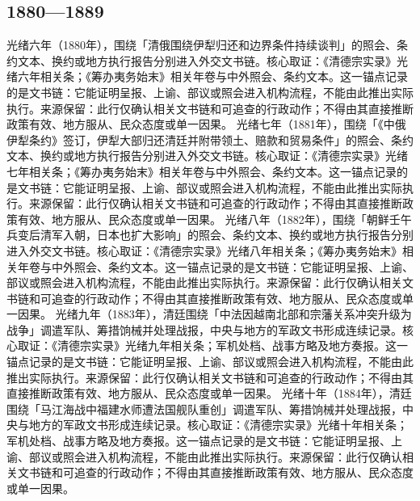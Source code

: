 \subsection{1880—1889}
光绪六年（1880年），围绕「清俄围绕伊犁归还和边界条件持续谈判」的照会、条约文本、换约或地方执行报告分别进入外交文书链。核心取证：《清德宗实录》光绪六年相关条；《筹办夷务始末》相关年卷与中外照会、条约文本。这一锚点记录的是文书链：它能证明呈报、上谕、部议或照会进入机构流程，不能由此推出实际执行。来源保留：此行仅确认相关文书链和可追查的行政动作；不得由其直接推断政策有效、地方服从、民众态度或单一因果。
光绪七年（1881年），围绕「《中俄伊犁条约》签订，伊犁大部归还清廷并附带领土、赔款和贸易条件」的照会、条约文本、换约或地方执行报告分别进入外交文书链。核心取证：《清德宗实录》光绪七年相关条；《筹办夷务始末》相关年卷与中外照会、条约文本。这一锚点记录的是文书链：它能证明呈报、上谕、部议或照会进入机构流程，不能由此推出实际执行。来源保留：此行仅确认相关文书链和可追查的行政动作；不得由其直接推断政策有效、地方服从、民众态度或单一因果。
光绪八年（1882年），围绕「朝鲜壬午兵变后清军入朝，日本也扩大影响」的照会、条约文本、换约或地方执行报告分别进入外交文书链。核心取证：《清德宗实录》光绪八年相关条；《筹办夷务始末》相关年卷与中外照会、条约文本。这一锚点记录的是文书链：它能证明呈报、上谕、部议或照会进入机构流程，不能由此推出实际执行。来源保留：此行仅确认相关文书链和可追查的行政动作；不得由其直接推断政策有效、地方服从、民众态度或单一因果。
光绪九年（1883年），清廷围绕「中法因越南北部和宗藩关系冲突升级为战争」调遣军队、筹措饷械并处理战报，中央与地方的军政文书形成连续记录。核心取证：《清德宗实录》光绪九年相关条；军机处档、战事方略及地方奏报。这一锚点记录的是文书链：它能证明呈报、上谕、部议或照会进入机构流程，不能由此推出实际执行。来源保留：此行仅确认相关文书链和可追查的行政动作；不得由其直接推断政策有效、地方服从、民众态度或单一因果。
光绪十年（1884年），清廷围绕「马江海战中福建水师遭法国舰队重创」调遣军队、筹措饷械并处理战报，中央与地方的军政文书形成连续记录。核心取证：《清德宗实录》光绪十年相关条；军机处档、战事方略及地方奏报。这一锚点记录的是文书链：它能证明呈报、上谕、部议或照会进入机构流程，不能由此推出实际执行。来源保留：此行仅确认相关文书链和可追查的行政动作；不得由其直接推断政策有效、地方服从、民众态度或单一因果。
